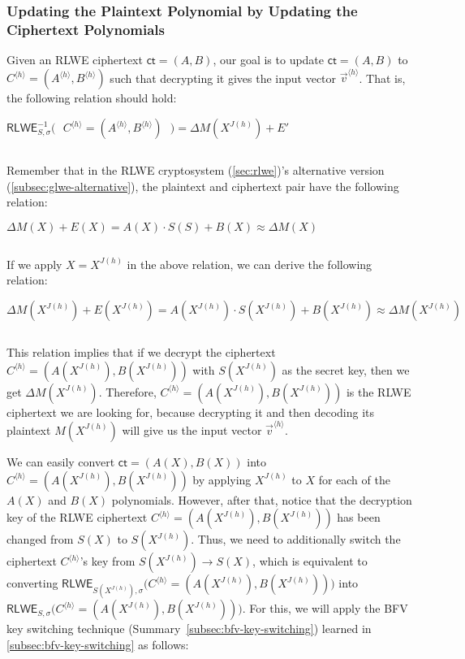 \subsubsection{Updating the Plaintext Polynomial by Updating the Ciphertext Polynomials}

Given an RLWE ciphertext $\textsf{ct} = (A, B)$, our goal is to update $\textsf{ct} = (A, B)$ to $C^{\langle h \rangle} = (A^{\langle h \rangle}, B^{\langle h \rangle})$ such that decrypting it gives the input vector $\vec{v}^{\langle h \rangle}$. That is, the following relation should hold: 

$\textsf{RLWE}^{-1}_{S, \sigma}\bm{(} \text{ } C^{\langle h \rangle} = (A^{\langle h \rangle}, B^{\langle h \rangle}) \text{ }\bm{)} = \Delta M(X^{J(h)}) + E'$

$ $

Remember that in the RLWE cryptosystem (\autoref{sec:rlwe})'s alternative version (\autoref{subsec:glwe-alternative}), the plaintext and ciphertext pair have the following relation:

$\Delta M(X) + E(X) = A(X)\cdot S(S) + B(X) \approx \Delta M(X)$

$ $

If we apply $X = X^{J(h)}$ in the above relation, we can derive the following relation: 

$\Delta M(X^{J(h)}) + E(X^{J(h)}) = A(X^{J(h)}) \cdot S(X^{J(h)}) + B(X^{J(h)}) \approx \Delta M(X^{J(h)})$

$ $

This relation implies that if we decrypt the ciphertext $C^{\langle h \rangle} = (A(X^{J(h)}), B(X^{J(h)}))$ with $S(X^{J(h)})$ as the secret key, then we get $\Delta M(X^{J(h)})$. Therefore, $C^{\langle h \rangle} = (A(X^{J(h)}), B(X^{J(h)}))$ is the RLWE ciphertext we are looking for, because decrypting it and then decoding its plaintext $M(X^{J(h)})$ will give us the input vector $\vec{v}^{\langle h \rangle}$. 

We can easily convert $\textsf{ct} = (A(X), B(X))$ into $C^{\langle h \rangle} = (A(X^{J(h)}), B(X^{J(h)}))$ by applying $X^{J(h)}$ to $X$ for each of the $A(X)$ and $B(X)$ polynomials. However, after that, notice that the decryption key of the RLWE ciphertext $C^{\langle h \rangle} = (A(X^{J(h)}), B(X^{J(h)}))$ has been changed from $S(X)$ to $S(X^{J(h)})$. Thus, we need to additionally switch the ciphertext $C^{\langle h \rangle}$'s key from $S(X^{J(h)}) \rightarrow S(X)$, which is equivalent to converting $\textsf{RLWE}_{S(X^{J(h)}), \sigma}\bm{(} C^{\langle h \rangle} = (A(X^{J(h)}), B(X^{J(h)})) \bm{)}$ into $\textsf{RLWE}_{S, \sigma}\bm{(} C^{\langle h \rangle} = (A(X^{J(h)}), B(X^{J(h)})) \bm{)}$. For this, we will apply the BFV key switching technique (Summary~\ref*{subsec:bfv-key-switching}) learned in \autoref{subsec:bfv-key-switching} as follows: 

